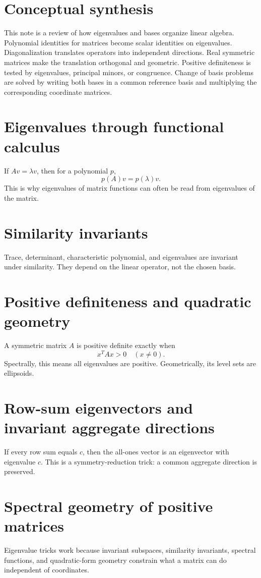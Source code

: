 \section{Conceptual synthesis}

This note is a review of how eigenvalues and bases organize linear algebra.  Polynomial identities for matrices become scalar identities on eigenvalues.  Diagonalization translates operators into independent directions.  Real symmetric matrices make the translation orthogonal and geometric.  Positive definiteness is tested by eigenvalues, principal minors, or congruence.  Change of basis problems are solved by writing both bases in a common reference basis and multiplying the corresponding coordinate matrices.

\section{Eigenvalues through functional calculus}
If \(Av=\lambda v\), then for a polynomial \(p\),
\[
p(A)v=p(\lambda)v.
\]
This is why eigenvalues of matrix functions can often be read from eigenvalues of the matrix.
\section{Similarity invariants}
Trace, determinant, characteristic polynomial, and eigenvalues are invariant under similarity.  They depend on the linear operator, not the chosen basis.
\section{Positive definiteness and quadratic geometry}
A symmetric matrix \(A\) is positive definite exactly when
\[
x^TAx>0\quad(x\ne0).
\]
Spectrally, this means all eigenvalues are positive.  Geometrically, its level sets are ellipsoids.
\section{Row-sum eigenvectors and invariant aggregate directions}
If every row sum equals \(c\), then the all-ones vector is an eigenvector with eigenvalue \(c\).  This is a symmetry-reduction trick: a common aggregate direction is preserved.
\section{Spectral geometry of positive matrices}
Eigenvalue tricks work because invariant subspaces, similarity invariants, spectral functions, and quadratic-form geometry constrain what a matrix can do independent of coordinates.


